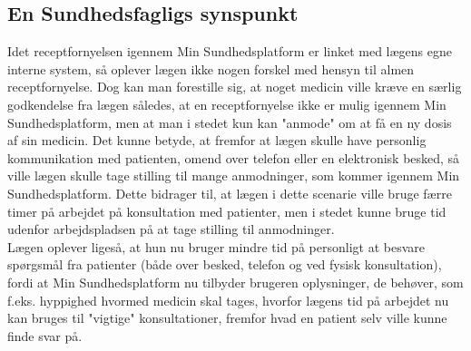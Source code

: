 \subsection{En Sundhedsfagligs synspunkt}
Idet receptfornyelsen igennem Min Sundhedsplatform er linket med lægens egne interne system, så oplever lægen ikke nogen forskel med hensyn til almen receptfornyelse. Dog kan man forestille sig, at noget medicin ville kræve en særlig godkendelse fra lægen således, at en receptfornyelse ikke er mulig igennem Min Sundhedsplatform, men at man i stedet kun kan "anmode" om at få en ny dosis af sin medicin. Det kunne betyde, at fremfor at lægen skulle have personlig kommunikation med patienten, omend over telefon eller en elektronisk besked, så ville lægen skulle tage stilling til mange anmodninger, som kommer igennem Min Sundhedsplatform. Dette bidrager til, at lægen i dette scenarie ville bruge færre timer på arbejdet på konsultation med patienter, men i stedet kunne bruge tid udenfor arbejdspladsen på at tage stilling til anmodninger. \\
Lægen oplever ligeså, at hun nu bruger mindre tid på personligt at besvare spørgsmål fra patienter (både over besked, telefon og ved fysisk konsultation), fordi at Min Sundhedsplatform nu tilbyder brugeren oplysninger, de behøver, som f.eks. hyppighed hvormed medicin skal tages, hvorfor lægens tid på arbejdet nu kan bruges til "vigtige" konsultationer, fremfor hvad en patient selv ville kunne finde svar på. 
